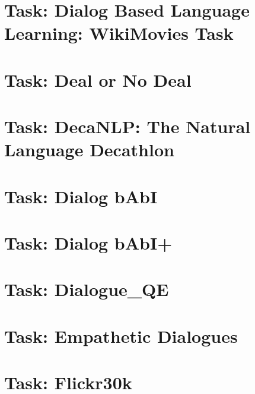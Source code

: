 \documentclass[twoside]{book}
\newcommand{\+}{\discretionary{\mbox{\scriptsize$\hookleftarrow$}}{}{}}
\begin{document}
\chapter{Task\+: Dialog Based Language Learning\+: Wiki\+Movies Task}
\label{md_parlai_tasks_dbll_movie_README}

\chapter{Task\+: Deal or No Deal}
\label{md_parlai_tasks_dealnodeal_README}

\chapter{Task\+: Deca\+N\+LP\+: The Natural Language Decathlon}
\label{md_parlai_tasks_decanlp_README}

\chapter{Task\+: Dialog b\+AbI}
\label{md_parlai_tasks_dialog_babi_README}

\chapter{Task\+: Dialog b\+Ab\+I+}
\label{md_parlai_tasks_dialog_babi_plus_README}

\chapter{Task\+: Dialogue\+\_\+\+QE}
\label{md_parlai_tasks_dialogue_qe_README}

\chapter{Task\+: Empathetic Dialogues}
\label{md_parlai_tasks_empathetic_dialogues_README}

\chapter{Task\+: Flickr30k}
\label{md_parlai_tasks_flickr30k_README}

\end{document}
